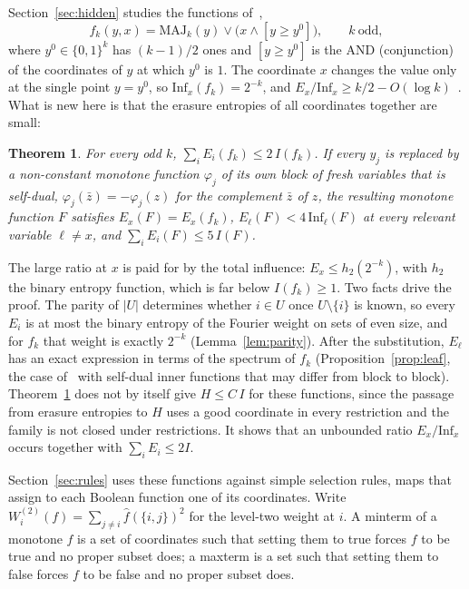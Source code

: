 \documentclass[11pt]{amsart}
\newtheorem{theorem}{Theorem}
\theoremstyle{remark}
\newcommand{\Inf}{\mathrm{Inf}}
\newcommand{\MAJ}{\mathrm{MAJ}}
\begin{document}
Section~\ref{sec:hidden} studies the functions of~\cite[Proposition~5.1]{Shm3},
\[
f_k(y,x)=\MAJ_k(y)\vee\bigl(x\wedge[y\ge y^0]\bigr),\qquad k\ \text{odd},
\]
where $y^0\in\{0,1\}^k$ has $(k-1)/2$ ones and $[y\ge y^0]$ is the AND (conjunction) of the coordinates of $y$ at which $y^0$ is $1$.
The coordinate $x$ changes the value only at the single point $y=y^0$, so $\Inf_x(f_k)=2^{-k}$, and
$E_x/\Inf_x\ge k/2-O(\log k)$~\cite[Proposition~5.1]{Shm3}. What is new here is that the erasure entropies of all
coordinates together are small:

\begin{theorem}\label{thm:sum}
For every odd $k$, $\sum_iE_i(f_k)\le2\,I(f_k)$. If every $y_j$ is replaced by a non-constant monotone function
$\varphi_j$ of its own block of fresh variables that is self-dual, $\varphi_j(\bar z)=-\varphi_j(z)$ for the
complement $\bar z$ of $z$, the resulting monotone function $F$ satisfies
$E_x(F)=E_x(f_k)$, $E_\ell(F)<4\,\Inf_\ell(F)$ at every relevant variable $\ell\ne x$, and
$\sum_iE_i(F)\le5\,I(F)$.
\end{theorem}

The large ratio at $x$ is paid for by the total influence: $E_x\le h_2(2^{-k})$, with $h_2$ the binary entropy
function, which is far below $I(f_k)\ge1$.
Two facts drive the proof. The parity of $|U|$ determines whether $i\in U$ once $U\setminus\{i\}$ is known, so every
$E_i$ is at most the binary entropy of the Fourier weight on sets of even size, and for $f_k$ that weight is exactly
$2^{-k}$ (Lemma~\ref{lem:parity}). After the substitution, $E_\ell$ has an exact expression in terms of the spectrum of
$f_k$ (Proposition~\ref{prop:leaf}, the case of~\cite[Theorem~2.1]{Shm3} with self-dual inner functions that may
differ from block to block). Theorem~\ref{thm:sum} does not by itself give $H\le C\,I$ for these functions, since the
passage from erasure entropies to $H$ uses a good coordinate in every restriction and the family is not closed under
restrictions. It shows that an unbounded ratio $E_x/\Inf_x$ occurs together with $\sum_iE_i\le2I$.

Section~\ref{sec:rules} uses these functions against simple selection rules, maps that assign to each Boolean
function one of its coordinates. Write $W^{(2)}_i(f)=\sum_{j\ne i}\hat f(\{i,j\})^2$ for the level-two weight at $i$.
A minterm of a monotone $f$ is a set of coordinates such that setting them to true forces $f$ to be true and no proper
subset does; a maxterm is a set such that setting them to false forces $f$ to be false and no proper subset does.
\end{document}
